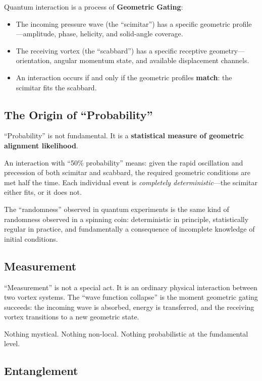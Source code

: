 Quantum interaction is a process of \textbf{Geometric Gating}:
\begin{itemize}
  \item The incoming pressure wave (the ``scimitar'') has a specific geometric profile---amplitude, phase, helicity, and solid-angle coverage.
  \item The receiving vortex (the ``scabbard'') has a specific receptive geometry---orientation, angular momentum state, and available displacement channels.
  \item An interaction occurs if and only if the geometric profiles \textbf{match}: the scimitar fits the scabbard.
\end{itemize}

\subsection{The Origin of ``Probability''}

``Probability'' is not fundamental. It is a \textbf{statistical measure of geometric alignment likelihood}.

An interaction with ``50\% probability'' means: given the rapid oscillation and precession of both scimitar and scabbard, the required geometric conditions are met half the time. Each individual event is \emph{completely deterministic}---the scimitar either fits, or it does not.

The ``randomness'' observed in quantum experiments is the same kind of randomness observed in a spinning coin: deterministic in principle, statistically regular in practice, and fundamentally a consequence of incomplete knowledge of initial conditions.

\subsection{Measurement}

``Measurement'' is not a special act. It is an ordinary physical interaction between two vortex systems. The ``wave function collapse'' is the moment geometric gating succeeds: the incoming wave is absorbed, energy is transferred, and the receiving vortex transitions to a new geometric state.

Nothing mystical. Nothing non-local. Nothing probabilistic at the fundamental level.

\subsection{Entanglement}

